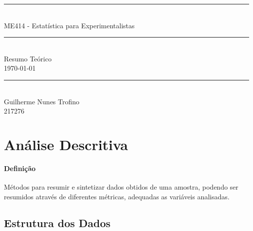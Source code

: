 \documentclass{article}
\begin{document}
    \begin{titlepage}
        \begin{center}
            \rule{450pt}{0.5pt}\\[4mm]
            {\Huge ME414 - Estatística para Experimentalistas}\\
            \rule{450pt}{0.5pt}\\[2mm]
            {\Large Resumo Teórico}\\[200mm]
            \today\\
            \rule{250pt}{0.5pt}\\
            {\large Guilherme Nunes Trofino}\\
            {\large 217276}\\
        \end{center}
    \end{titlepage}
\newpage

    \tableofcontents
\newpage

    \section{Análise Descritiva}
        \paragraph{Definição}Métodos para resumir e sintetizar dados obtidos de uma amostra, podendo ser resumidos através de diferentes métricas, adequadas as variáveis analisadas.

        \subsection{Estrutura dos Dados}
\end{document}
